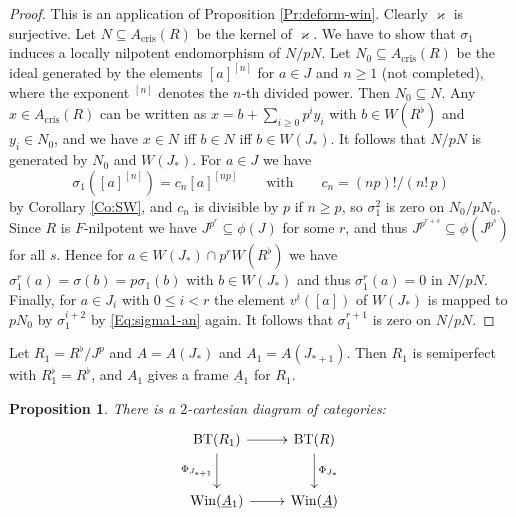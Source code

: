 \documentclass[a4paper,11pt]{article}
\theoremstyle{plain}
\newtheorem{Prop}[Lemma]{Proposition}
\theoremstyle{definition}
\theoremstyle{remark}
\theoremstyle{definition}
\numberwithin{Lemma}{section}
\numberwithin{Subpoint}{Lemma}
\numberwithin{equation}{section}
\DeclareMathOperator{\BT}{BT}
\DeclareMathOperator{\Win}{Win}
\DeclareMathOperator{\cris}{cris}
\renewcommand{\u}{\underline}
\newcommand{\chang}[1]{{#1}}
\begin{document}
\begin{proof}
This is an application of Proposition \ref{Pr:deform-win}.
\chang{Clearly} $\varkappa$ is surjective.
Let $N\subseteq A_{\cris}(R)$ be the kernel of $\varkappa$.
We have to show that $\sigma_1$ induces a \chang{locally} nilpotent
endomorphism of $N/pN$. 
Let $N_0\subseteq A_{\cris}(R)$ be the ideal 
generated by the elements
$[a]^{[n]}$ for $a\in J$ and $n\ge 1$ (not completed),
where the exponent $^{[n]}$ denotes the $n$-th divided power.
Then $N_0\subseteq N$.
\chang{Any} $x\in A_{\cris}(R)$ can be written as $x=b+\sum_{i\ge 0}p^iy_i$
with $b\in W(R^\flat)$ and $y_i\in N_0$,
and we have $x\in N$ iff $b\in N$ iff $b\in W(J_*)$.
It follows that $N/pN$ is generated by $N_0$ and $W(J_*)$.
For $a\in J$ we have
\begin{equation}
\label{Eq:sigma1-an}
\sigma_1([a]^{[n]})=c_n[a]^{[np]}
\qquad
\text{with} 
\qquad
c_n=(np)!/(n!\, p)
\end{equation}
by \chang{Corollary \ref{Co:SW}},
and $c_n$ is divisible by $p$ if $n\ge p$, 
so $\sigma_1^2$ is zero on $N_0/pN_0$.
Since $R$ is $F$-nilpotent we have 
$J^{p^r}\subseteq\phi(J)$ for some $r$,
and thus $J^{p^{r+s}}\subseteq\phi(J^{p^s})$ for \chang{all} $s$.
Hence for $a\in W(J_*)\cap p^rW(R^\flat)$ we have
$\sigma_1^r(a)=\sigma(b)=p\sigma_1(b)$ with $b\in W(J_*)$
and thus $\sigma_1^r(a)=0$ in $N/pN$.
Finally, for $a\in J_i$ with $0\le i<r$ the element $v^i([a])$ of $W(J_*)$
is mapped to $pN_0$ by $\sigma_1^{i+2}$ by \eqref{Eq:sigma1-an} again.
It follows that $\sigma_1^{r+1}$ is zero on $N/pN$.
\end{proof}

Let $R_1=R^\flat/J^p$ and $A=A(J_*)$ and $A_1=A(J_{*+1})$.
Then $R_1$ is semiperfect with
$R_1^\flat=R^\flat$, and $A_1$ gives a frame $\u A{}_1$ for $R_1$.

\begin{Prop}
\label{Pr:BT-R1-R}
There is a $2$-cartesian diagram of categories:
\[
\xymatrix@M+0.2em{
\BT(R_1) \ar[r] \ar[d]_{\Phi_{J_{*+1}}} & 
\BT(R) \ar[d]^{\Phi_{J_{*}}} \\ 
\Win(\u A{}_1) \ar[r] &
\Win(\u A)
}
\] 
\end{Prop}
\end{document}
